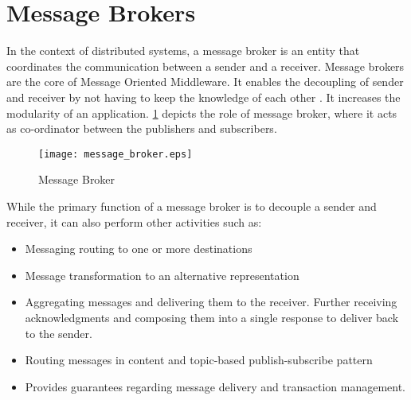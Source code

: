 \section{Message Brokers}

In the context of distributed systems, a message broker is an entity that coordinates the communication between a sender and a receiver. Message brokers are the core of Message Oriented Middleware. It enables the decoupling of sender and receiver by not having to keep the knowledge of each other \parencite{message_brokers}. It increases the modularity of an application. \ref{figures:message_broker} depicts the role of message broker, where it acts as co-ordinator between the publishers and subscribers.

\makeatletter
\setlength{\intextsep}{25pt}
\makeatother

\begin{figure}[h]
\centering
\texttt{[image: message\_broker.eps]}
\caption{Message Broker}\label{figures:message_broker}
\end{figure}

While the primary function of a message broker is to decouple a sender and receiver, it can also perform other activities \parencite{message_brokers_usage} such as:

\begin{itemize}
  \item Messaging routing to one or more destinations
  \item Message transformation to an alternative representation
  \item Aggregating messages and delivering them to the receiver. Further receiving acknowledgments and composing them into a single response to deliver back to the sender.
  \item Routing messages in content and topic-based publish-subscribe pattern
  \item Provides guarantees regarding message delivery and transaction management.
\end{itemize}